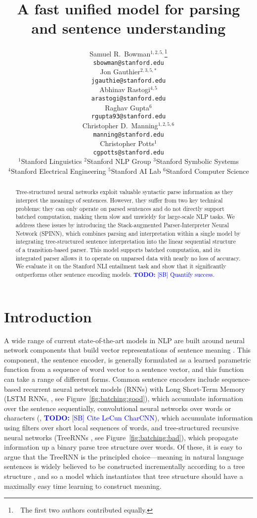 \documentclass[11pt]{article}
\title{A fast unified model for parsing and sentence understanding}
\author{
    Samuel R.\ Bowman$^{1,2,5,}$\thanks{~\,The first two authors contributed equally.} \\
    \texttt{\small sbowman@stanford.edu} \\
    \And
    Jon Gauthier$^{2,3,5,*}$ \\
    \texttt{\small jgauthie@stanford.edu} \\
    \And
    Abhinav Rastogi$^{4,5}$ \\
    \texttt{\small arastogi@stanford.edu} \\
    \AND
    Raghav Gupta$^{6}$ \\
    \texttt{\small rgupta93@stanford.edu} \\
    \And
    Christopher D.\ Manning$^{1,2,5,6}$\\
    \texttt{\small manning@stanford.edu}\\
    \And
    Christopher Potts$^{1}$\\
    \texttt{\small cgpotts@stanford.edu}
    \AND\\[-3ex]
    {$^{1}$Stanford Linguistics\quad
    $^{2}$Stanford NLP Group\quad
    $^{3}$Stanford Symbolic Systems}\\
    {$^{4}$Stanford Electrical Engineering\quad
    $^{5}$Stanford AI Lab\quad
    $^{6}$Stanford Computer Science}
    }
\date{}
\newcommand\todo[1]{\textcolor{blue}{\textbf{TODO:} #1}}
\begin{document}
\maketitle
\begin{abstract}

Tree-structured neural networks exploit valuable syntactic parse information as they interpret the meanings of sentences. However, they suffer from two key technical problems: they can only operate on parsed sentences and do not directly support batched computation, making them slow and unwieldy for large-scale NLP tasks. We address these issues by introducing the Stack-augmented Parser-Interpreter Neural Network (SPINN), which combines parsing and interpretation within a single model by integrating tree-structured sentence interpretation into the linear sequential structure of a transition-based parser. This model  supports batched computation, and its integrated parser allows it to operate on unparsed data with nearly no loss of accuracy. We evaluate it on the Stanford NLI entailment task and show that it significantly outperforms other sentence encoding models. \todo{[SB] Quantify success.}

\end{abstract}

\section{Introduction}




A wide range of current state-of-the-art models in NLP are built around neural network components that build vector representations of sentence meaning \citep{socher2011semi,sutskever2014sequence,vinyals2015neural}. This component, the sentence encoder, is generally formulated as a learned parametric function from a sequence of word vector to a sentence vector, and this function can take a range of different forms. Common sentence encoders include sequence-based recurrent neural network models (RNNs) with Long Short-Term Memory (LSTM RNNs, \citet{hochreiter1997long}, see Figure~\ref{fig:batching:good}), which accumulate information over the sentence sequentially, convolutional neural networks over words or characters (\citet{kalchbrenner2014convolutional}, \todo{[SB] Cite LeCun CharCNN}), which accumulate information using filters over short local sequences of words, and tree-structured recursive neural networks (TreeRNNs \citet{goller1996learning,socher2011semi}, see Figure~\ref{fig:batching:bad}), which propagate information up a binary parse tree structure over words. Of these, it is easy to argue that the TreeRNN is the principled choice---meaning in natural language sentences is widely believed to be constructed incrementally according to a tree structure \citep{Partee84,Janssen97}, and so a model which instantiates that tree structure should have a maximally easy time learning to construct meaning.
\end{document}
